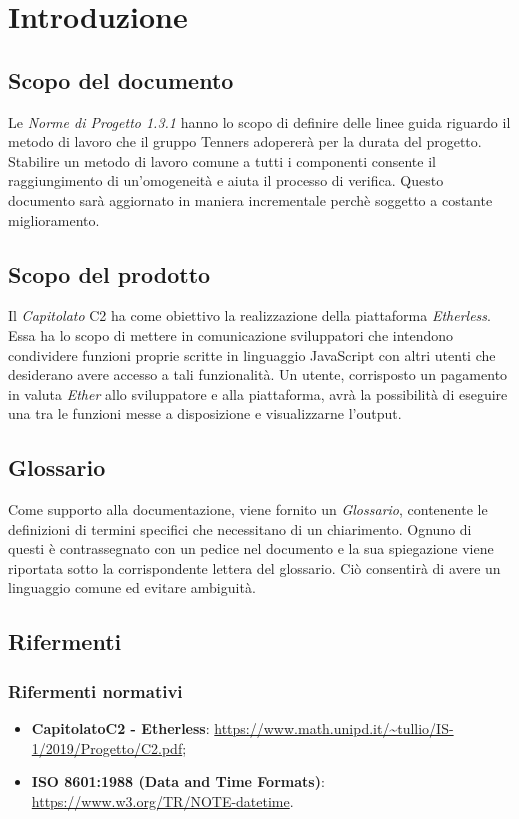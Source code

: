 \section{Introduzione}

\subsection{Scopo del documento}
Le \textit{Norme di Progetto 1.3.1\doc} hanno lo scopo di definire delle linee guida riguardo il metodo di lavoro che il gruppo Tenners adopererà per la durata del progetto. Stabilire un metodo di lavoro comune a tutti i componenti consente il raggiungimento di un'omogeneità e aiuta il processo di verifica. Questo documento sar\`a aggiornato in maniera incrementale perchè soggetto a costante miglioramento.

\subsection{Scopo del prodotto}
Il \textit{Capitolato\glo} C2 ha come obiettivo la realizzazione della piattaforma \textit{Etherless}. Essa ha lo scopo di mettere in comunicazione sviluppatori che intendono condividere funzioni proprie scritte in linguaggio JavaScript con altri utenti che desiderano avere accesso a tali funzionalità. Un utente, corrisposto un pagamento in valuta \textit{Ether\glo} allo sviluppatore e alla piattaforma, avrà la possibilità di eseguire una tra le funzioni messe a disposizione e visualizzarne l'output.

\subsection{Glossario}
Come supporto alla documentazione, viene fornito un \textit{Glossario}\docs,
contenente le definizioni di termini specifici che necessitano di un chiarimento.
Ognuno di questi è contrassegnato con un pedice \glo nel documento e la sua
spiegazione viene riportata sotto la corrispondente lettera del glossario. Ciò
consentir\`a di avere un linguaggio comune ed evitare ambiguità.

\subsection{Rifermenti}
\subsubsection{Rifermenti normativi}
\begin{itemize}
  \item \textbf{Capitolato\glo C2 - Etherless}: \url{https://www.math.unipd.it/~tullio/IS-1/2019/Progetto/C2.pdf};
  \item \textbf{ISO 8601:1988 (Data and Time Formats)}: \url {https://www.w3.org/TR/NOTE-datetime}.
\end{itemize}

